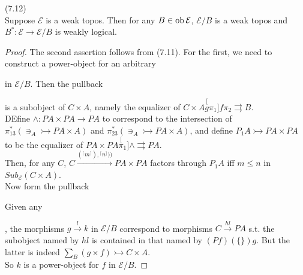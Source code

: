 \documentclass[a4paper]{article}
\begin{document}
\begin{thm} (7.12)\\
    Suppose $\mathcal{E}$ is a weak topos. Then for any $B \in \operatorname{ob}\mathcal{E}$, $\mathcal{E}/B$ is a weak topos and $B^*:\mathcal{E} \to \mathcal{E}/B$ is weakly logical.
    \begin{proof}
        The second assertion follows from (7.11). For the first, we need to construct a power-object for an arbitrary 
        in $\mathcal{E}/B$. Then the pullback


        is a subobject of $C \times A$, namely the equalizer of $C \times A \stackrel[g\pi_1]{f\pi_2}{\rightrightarrows} B$.\\
        DEfine $\wedge: PA \times PA \to PA$ to correspond to the intersection of $\pi_{13}^* (\ni_A \rightarrowtail PA \times A)$ and $\pi_{23}^*(\ni_A \rightarrowtail PA \times A)$, and define $P_1A \rightarrowtail PA \times PA$ to be the equalizer of $PA \times PA \stackrel[\pi_1]{\wedge}{\rightrightarrows} PA$.\\
        Then, for any $C$, $C \xrightarrow{({}^{\lceil}m^\rceil),{}^{\lceil}n^\rceil))} PA \times PA$ factors through $P_1 A$ iff $m \leq n$ in $Sub_{\mathcal{E}}(C \times A)$.\\
        Now form the pullback


        Given any 
        , the morphisms $g \xrightarrow{l} k$ in $\mathcal{E}/B$ correspond to morphisms $C \xrightarrow{hl} PA$ s.t. the subobject named by $hl$ is contained in that named by $(Pf)(\{\}) g$. But the latter is indeed $\sum_B(g \times f) \rightarrowtail C \times A$.\\
        So $k$ is a power-object for $f$ in $\mathcal{E}/B$.
    \end{proof}
\end{thm}
\end{document}
